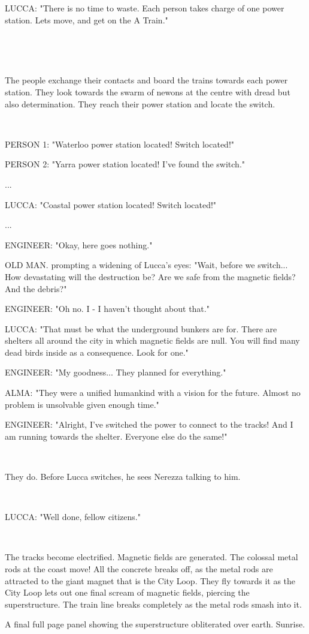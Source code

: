 \documentclass[11pt]{article}
\begin{document}
LUCCA: "There is no time to waste. 
Each person takes charge of one power station.
Lets move, and get on the A Train."

\ 

\ 

The people exchange their contacts and board the trains towards each power station.
They look towards the swarm of newons at the centre with dread but also determination.
They reach their power station and locate the switch. 

\ 

PERSON 1: "Waterloo power station located! Switch located!"

PERSON 2: "Yarra power station located! I've found the switch." 

...

LUCCA: "Coastal power station located! Switch located!"

...

ENGINEER: "Okay, here goes nothing."

OLD MAN. prompting a widening of Lucca's eyes: "Wait, before we switch...
How devastating will the destruction be? 
Are we safe from the magnetic fields?
And the debris?"

ENGINEER: "Oh no. 
I - I haven't thought about that."

LUCCA: "That must be what the underground bunkers are for.
There are shelters all around the city in which magnetic fields are null.
You will find many dead birds inside as a consequence. 
Look for one."

ENGINEER: "My goodness... They planned for everything."

ALMA: "They were a unified humankind with a vision for the future.
Almost no problem is unsolvable given enough time."

ENGINEER: "Alright, I've switched the power to connect to the tracks!
And I am running towards the shelter. 
Everyone else do the same!"

\ 

They do.
Before Lucca switches, he sees Nerezza talking to him.



\ 

LUCCA: "Well done, fellow citizens."

\ 

The tracks become electrified. 
Magnetic fields are generated. 
The colossal metal rods at the coast move!
All the concrete breaks off, as the metal rods are attracted to the giant magnet that is the City Loop. 
They fly towards it as the City Loop lets out one final scream of magnetic fields, piercing the superstructure.
The train line breaks completely as the metal rods smash into it. 

A final full page panel showing the superstructure obliterated over earth.
Sunrise.
\end{document}
